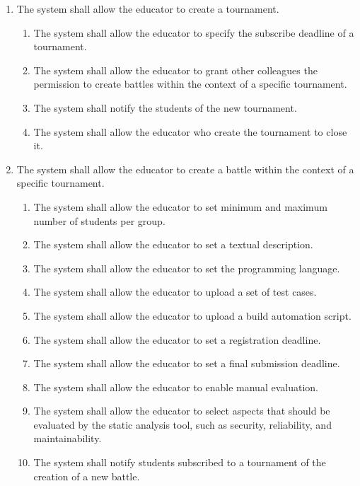 \begin{enumerate}[label=\textbf{R\arabic*}:,leftmargin=1.3cm]
    \item The system shall allow the educator to create a tournament.
          \begin{enumerate}[label=\textbf{R\arabic{enumi}.\arabic*}:, leftmargin=*]
              \item The system shall allow the educator to specify the subscribe deadline of a tournament.
              \item The system shall allow the educator to grant other colleagues the permission to create battles within the context of a specific tournament.
              \item The system shall notify the students of the new tournament.
              \item The system shall allow the educator who create the tournament to close it.
          \end{enumerate}
    \item The system shall allow the educator to create a battle within the context of a specific tournament.
          \begin{enumerate}[label=\textbf{R\arabic{enumi}.\arabic*}:, leftmargin=*]
              \item The system shall allow the educator to set minimum and maximum number of students per group.
              \item The system shall allow the educator to set a textual description.
              \item The system shall allow the educator to set the programming language.
              \item The system shall allow the educator to upload a set of test cases.
              \item The system shall allow the educator to upload a build automation script.
              \item The system shall allow the educator to set a registration deadline.
              \item The system shall allow the educator to set a final submission deadline.
              \item The system shall allow the educator to enable manual evaluation.
              \item The system shall allow the educator to select aspects that should be evaluated by the static analysis tool, such as security, reliability, and maintainability.
              \item The system shall notify students subscribed to a tournament of the creation of a new battle.

\end{enumerate}
\end{enumerate}
